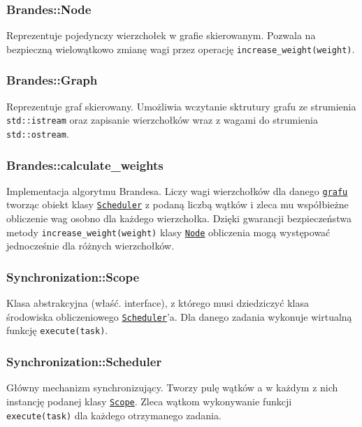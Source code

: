 \documentclass{article}
\begin{document}
      \subsubsection{Brandes::Node}
      \label{class:brandes__node}
      Reprezentuje pojedynczy wierzchołek w grafie skierowanym. Pozwala na
      bezpieczną wielowątkowo zmianę wagi przez operację
      \texttt{increase\_weight(weight)}.

      \subsubsection{Brandes::Graph}
      \label{class:brandes__graph}
      Reprezentuje graf skierowany. Umożliwia wczytanie sktrutury grafu ze strumienia
      \texttt{std::istream} oraz zapisanie wierzchołków wraz z wagami do strumienia
      \texttt{std::ostream}.

      \subsubsection{Brandes::calculate\_weights}
      \label{func:brandes__calculate_weights}
      Implementacja algorytmu Brandesa. Liczy wagi wierzchołków dla danego
      \hyperref[class:brandes__graph]{\texttt{grafu}} tworząc obiekt klasy
      \hyperref[class:synchronization__scheduler]{\texttt{Scheduler}} z podaną
      liczbą wątków i zleca mu współbieżne obliczenie wag osobno dla każdego
      wierzchołka. Dzięki gwarancji bezpieczeństwa metody
      \texttt{increase\_weight(weight)} klasy \hyperref[class:brandes__node]
      {\texttt{Node}} obliczenia mogą występować jednocześnie dla różnych
      wierzchołków.

      \subsubsection{Synchronization::Scope}
      \label{class:synchronization__scope}
      Klasa abstrakcyjna (właść. interface), z którego musi dziedziczyć klasa
      środowiska obliczeniowego \hyperref[class:synchronization__scheduler]
      {\texttt{Scheduler}}'a. Dla danego zadania wykonuje wirtualną funkcję
      \texttt{execute(task)}.

      \subsubsection{Synchronization::Scheduler}
      \label{class:synchronization__scheduler}
      Główny mechanizm synchronizujący. Tworzy pulę wątków a w każdym z nich
      instancję podanej klasy \hyperref[class:synchronization_scope]{\texttt{Scope}}.
      Zleca wątkom wykonywanie funkcji \texttt{execute(task)} dla każdego otrzymanego
      zadania.
\end{document}
